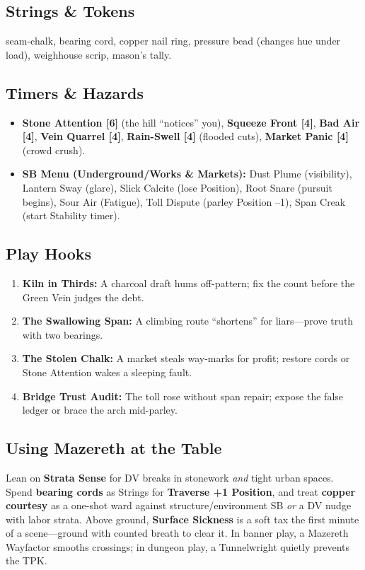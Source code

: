 \documentclass[11pt]{book}
\begin{document}
\subsection*{Strings \& Tokens}
seam-chalk, bearing cord, copper nail ring, pressure bead (changes hue under load), weighhouse scrip, mason's tally.

\subsection*{Timers \& Hazards}
\begin{itemize}
    \item \textbf{Stone Attention [6]} (the hill ``notices'' you), \textbf{Squeeze Front [4]}, \textbf{Bad Air [4]}, \textbf{Vein Quarrel [4]}, \textbf{Rain-Swell [4]} (flooded cuts), \textbf{Market Panic [4]} (crowd crush).
    \item \textbf{SB Menu (Underground/Works \& Markets):} Dust Plume (visibility), Lantern Sway (glare), Slick Calcite (lose Position), Root Snare (pursuit begins), Sour Air (Fatigue), Toll Dispute (parley Position --1), Span Creak (start Stability timer).
\end{itemize}

\subsection*{Play Hooks}
\begin{enumerate}
    \item \textbf{Kiln in Thirds:} A charcoal draft hums off-pattern; fix the count before the Green Vein judges the debt.
    \item \textbf{The Swallowing Span:} A climbing route ``shortens'' for liars---prove truth with two bearings.
    \item \textbf{The Stolen Chalk:} A market steals way-marks for profit; restore cords or Stone Attention wakes a sleeping fault.
    \item \textbf{Bridge Trust Audit:} The toll rose without span repair; expose the false ledger or brace the arch mid-parley.
\end{enumerate}

\subsection*{Using Mazereth at the Table}
Lean on \textbf{Strata Sense} for DV breaks in stonework \emph{and} tight urban spaces. Spend \textbf{bearing cords} as Strings for \textbf{Traverse +1 Position}, and treat \textbf{copper courtesy} as a one-shot ward against structure/environment SB \emph{or} a DV nudge with labor strata. Above ground, \textbf{Surface Sickness} is a soft tax the first minute of a scene---ground with counted breath to clear it. In banner play, a Mazereth Wayfactor smooths crossings; in dungeon play, a Tunnelwright quietly prevents the TPK.
\end{document}
